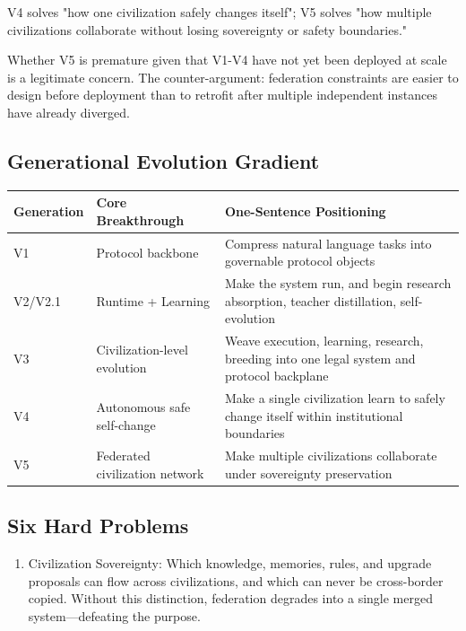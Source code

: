 \documentclass[12pt,a4paper]{article}
\begin{document}
V4 solves "how one civilization safely changes itself"; V5 solves "how multiple civilizations collaborate without losing sovereignty or safety boundaries."

Whether V5 is premature given that V1-V4 have not yet been deployed at scale is a legitimate concern. The counter-argument: federation constraints are easier to design before deployment than to retrofit after multiple independent instances have already diverged.

\subsection{Generational Evolution Gradient}


\begin{table}[htbp]
\centering
\small
\begin{tabular}{lll}
\toprule
Generation & Core Breakthrough & One-Sentence Positioning \\
\midrule
V1 & Protocol backbone & Compress natural language tasks into governable protocol objects \\
V2/V2.1 & Runtime + Learning & Make the system run, and begin research absorption, teacher distillation, self-evolution \\
V3 & Civilization-level evolution & Weave execution, learning, research, breeding into one legal system and protocol backplane \\
V4 & Autonomous safe self-change & Make a single civilization learn to safely change itself within institutional boundaries \\
V5 & Federated civilization network & Make multiple civilizations collaborate under sovereignty preservation \\
\bottomrule
\end{tabular}
\end{table}


\subsection{Six Hard Problems}


\begin{enumerate}
  \item Civilization Sovereignty: Which knowledge, memories, rules, and upgrade proposals can flow across civilizations, and which can never be cross-border copied. Without this distinction, federation degrades into a single merged system---defeating the purpose.
\end{enumerate}
\end{document}
